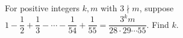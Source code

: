 For positive integers $k,m$ with $3\nmid m$, suppose $1-\dfrac{1}{2}+\dfrac{1}{3}-\cdots-\dfrac{1}{54}+\dfrac{1}{55}=\dfrac{3^km}{28\cdot29\cdots55}$. Find $k$.
